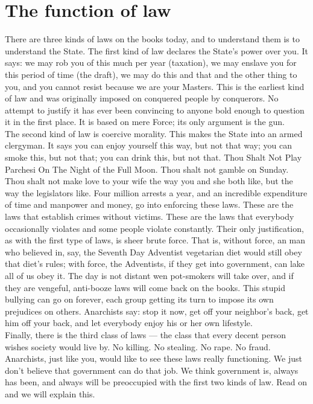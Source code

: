 \section*{The function of law}

There are three kinds of laws on the books today, and to understand them is to understand the State. The first kind of law declares the State's power over you. It says: we may rob you of this much per year (taxation), we may enslave you for this period of time (the draft), we may do this and that and the other thing to you, and you cannot resist because we are your Masters. This is the earliest kind of law and was originally imposed on conquered people by conquerors. No attempt to justify it has ever been convincing to anyone bold enough to question it in the first place. It is based on mere Force; its only argument is the gun.\\
The second kind of law is coercive morality. This makes the State into an armed clergyman. It says you can enjoy yourself this way, but not that way; you can smoke this, but not that; you can drink this, but not that. Thou Shalt Not Play Parchesi On The Night of the Full Moon. Thou shalt not gamble on Sunday. Thou shalt not make love to your wife the way you and she both like, but the way the legislators like. Four million arrests a year, and an incredible expenditure of time and manpower and money, go into enforcing these laws. These are the laws that establish crimes without victims. These are the laws that everybody occasionally violates and some people violate constantly. Their only justification, as with the first type of laws, is sheer brute force. That is, without force, an man who believed in, say, the Seventh Day Adventist vegetarian diet would still obey that diet's rules; with force, the Adventists, if they get into government, can lake all of us obey it. The day is not distant wen pot-smokers will take over, and if they are vengeful, anti-booze laws will come back on the books. This stupid bullying can go on forever, each group getting its turn to impose its own prejudices on others. Anarchists say: stop it now, get off your neighbor's back, get him off your back, and let everybody enjoy his or her own lifestyle.\\
Finally, there is the third class of laws --- the class that every decent person wishes society would live by. No killing. No stealing. No rape. No fraud. Anarchists, just like you, would like to see these laws really functioning. We just don't believe that government can do that job. We think government is, always has been, and always will be preoccupied with the first two kinds of law. Read on and we will explain this.

